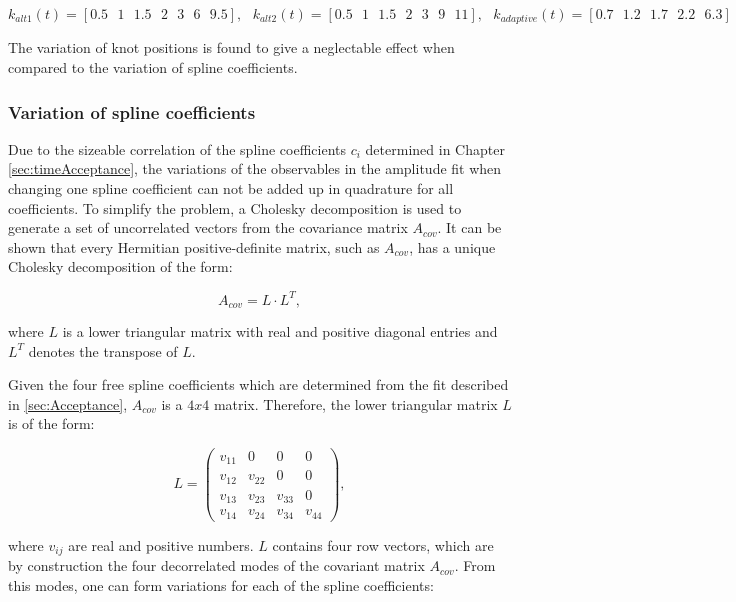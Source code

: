 \[ k_{alt1}(t) =  [0.5\mbox{ } 1 \mbox{ }1.5 \mbox{ }2 \mbox{ }3 \mbox{ }6 \mbox{ }9.5], 
\mbox{ } k_{alt2}(t) =  [0.5 \mbox{ } 1\mbox{ }  1.5 \mbox{ } 2 \mbox{ } 3\mbox{ }  9\mbox{ } 11],  
\mbox{ } k_{adaptive}(t) =  [0.7\mbox{ } 1.2\mbox{ } 1.7\mbox{ } 2.2\mbox{ } 6.3] \]

The variation of knot positions is found to give a neglectable effect when compared to the variation of spline coefficients.

\subsubsection{Variation of spline coefficients}

Due to the sizeable correlation of the spline coefficients $c_{i}$ determined in Chapter \ref{sec:timeAcceptance}, 
the variations of the observables in the amplitude fit when changing one spline coefficient can not be added up in quadrature for all coefficients.
To simplify the problem, a Cholesky decomposition \cite{Golub:1996:MC:248979} is used to generate a set of uncorrelated vectors from the covariance matrix $A_{cov}$.
It can be shown that every Hermitian positive-definite matrix, such as $A_{cov}$, has a unique Cholesky decomposition of the form:

\begin{equation}
A_{cov} = L \cdot L^{T},
\label{eq:choleskyDecomp}
\end{equation}

where $L$ is a lower triangular matrix with real and positive diagonal entries and $L^{T}$ denotes the transpose of $L$. \newline

Given the four free spline coefficients which are determined from the fit described in \ref{sec:Acceptance}, $A_{cov}$ is a $4x4$ matrix. Therefore, the lower triangular matrix $L$ is of the form:

\begin{equation}
L = \begin{pmatrix}
v_{11} & 0 & 0 & 0 \\
v_{12} & v_{22} & 0 & 0 \\
v_{13} & v_{23} & v_{33} & 0\\ 
v_{14} & v_{24} & v_{34} & v_{44}
\end{pmatrix},
\label{eq:choleskyVectors}
\end{equation}


where $v_{ij}$ are real and positive numbers. $L$ contains four row vectors, which are by construction the four decorrelated modes of the covariant matrix $A_{cov}$. 
From this modes, one can form variations for each of the spline coefficients:

